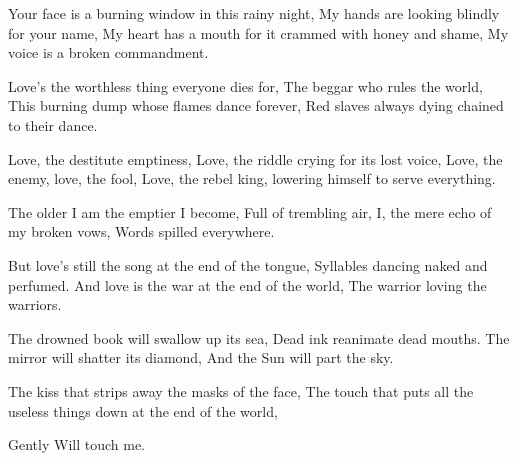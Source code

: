 \documentclass[english,11pt,letterpaper,onecolumn,parskip=full]{scrbook}
\begin{document}
\begin{poem}
\begin{stanza}
Your face is a burning window in this rainy night,\verseline
My hands are looking blindly for your name,\verseline
My heart has a mouth for it crammed with honey and shame,\verseline
My voice is a broken commandment.
\end{stanza}

\begin{stanza}
Love's the worthless thing everyone dies for,\verseline
The beggar who rules the world,\verseline
This burning dump whose flames dance forever,\verseline
Red slaves always dying chained to their dance.
\end{stanza}

\begin{stanza}
Love, the destitute emptiness,\verseline
Love, the riddle crying for its lost voice,\verseline
Love, the enemy, love, the fool,\verseline
Love, the rebel king, lowering himself to serve everything.
\end{stanza}

\begin{stanza}
The older I am the emptier I become,\verseline
Full of trembling air,\verseline
I, the mere echo of my broken vows,\verseline
Words spilled everywhere.
\end{stanza}

\begin{stanza}
But love's still the song at the end of the tongue,\verseline
Syllables dancing naked and perfumed.\verseline
And love is the war at the end of the world,\verseline
The warrior loving the warriors.
\end{stanza}

\begin{stanza}
The drowned book will swallow up its sea,\verseline
Dead ink reanimate dead mouths.\verseline
The mirror will shatter its diamond,\verseline
And the Sun will part the sky.
\end{stanza}

\begin{stanza}
The kiss that strips away the masks of the face,\verseline
The touch that puts all the useless things down at the end of the world,
\end{stanza}

\begin{stanza}
Gently\verseline
Will touch me.	
\end{stanza}
\end{poem}
\end{document}
